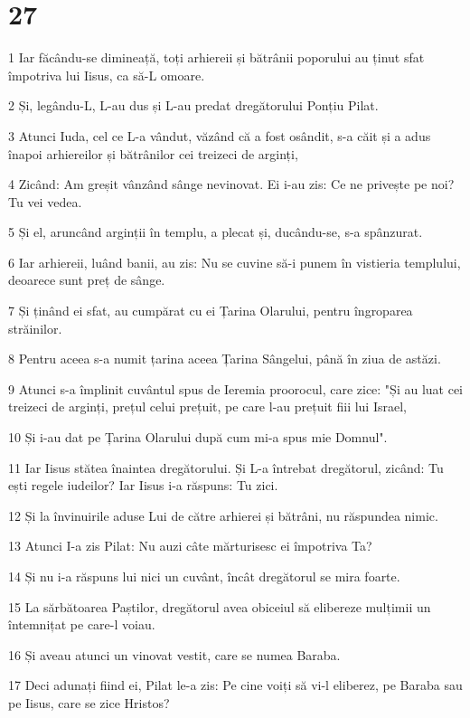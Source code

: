 \chapter{27}

\par 1 Iar făcându-se dimineață, toți arhiereii și bătrânii poporului au ținut sfat împotriva lui Iisus, ca să-L omoare.
\par 2 Și, legându-L, L-au dus și L-au predat dregătorului Ponțiu Pilat.
\par 3 Atunci Iuda, cel ce L-a vândut, văzând că a fost osândit, s-a căit și a adus înapoi arhiereilor și bătrânilor cei treizeci de arginți,
\par 4 Zicând: Am greșit vânzând sânge nevinovat. Ei i-au zis: Ce ne privește pe noi? Tu vei vedea.
\par 5 Și el, aruncând arginții în templu, a plecat și, ducându-se, s-a spânzurat.
\par 6 Iar arhiereii, luând banii, au zis: Nu se cuvine să-i punem în vistieria templului, deoarece sunt preț de sânge.
\par 7 Și ținând ei sfat, au cumpărat cu ei Țarina Olarului, pentru îngroparea străinilor.
\par 8 Pentru aceea s-a numit țarina aceea Țarina Sângelui, până în ziua de astăzi.
\par 9 Atunci s-a împlinit cuvântul spus de Ieremia proorocul, care zice: "Și au luat cei treizeci de arginți, prețul celui prețuit, pe care l-au prețuit fiii lui Israel,
\par 10 Și i-au dat pe Țarina Olarului după cum mi-a spus mie Domnul".
\par 11 Iar Iisus stătea înaintea dregătorului. Și L-a întrebat dregătorul, zicând: Tu ești regele iudeilor? Iar Iisus i-a răspuns: Tu zici.
\par 12 Și la învinuirile aduse Lui de către arhierei și bătrâni, nu răspundea nimic.
\par 13 Atunci I-a zis Pilat: Nu auzi câte mărturisesc ei împotriva Ta?
\par 14 Și nu i-a răspuns lui nici un cuvânt, încât dregătorul se mira foarte.
\par 15 La sărbătoarea Paștilor, dregătorul avea obiceiul să elibereze mulțimii un întemnițat pe care-l voiau.
\par 16 Și aveau atunci un vinovat vestit, care se numea Baraba.
\par 17 Deci adunați fiind ei, Pilat le-a zis: Pe cine voiți să vi-l eliberez, pe Baraba sau pe Iisus, care se zice Hristos?
